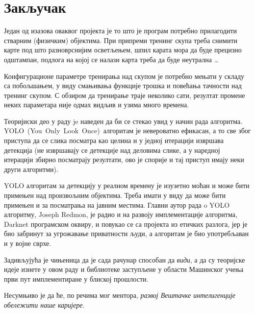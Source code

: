 \documentclass[12pt, а4paper]{article}
\begin{document}
\newpage
\section{Закључак}
Један од изазова оваквог пројекта је
то што је програм потребно прилагодити стварним (физичким)
објектима. При припреми тренинг скупа треба снимити
карте под што разноврснијим осветљењем, шпил карата мора
да буде прецизно одштампан, подлога на којој се налази карта
треба да буде неутрална \dots 

Конфигурационе параметре тренирања над скупом је потребно
мењати у складу са побољшањем, у виду смањивања
функције трошка и повећања тачности над тренинг скупом.
С обзиром да тренирање траје неколико сати, резултат
промене неких параметара није одмах видљив и
узима много времена.

Теоријиски део у раду je наведен да би се стекао увид
у начин рада алгоритма.
\mbox{YOLO (You Only Look Once) алгоритам} је невероватно ефикасан, а то све
због приступа да се слика посматра као целина и у једној итерацији
извршава детекција (не извршавају се детекције над деловима слике, а
у наредној итерацији збирно посматрају резултати, ово је спорије и
тај приступ имају неки други алгоритми).

YOLO алгоритам за детекцију у реалном времену је изузетно моћан
и може бити примењен над произвољним објектима.
Треба имати у виду да може бити примењен и
за посматрања на јавним местима. Главни
аутор рада o YOLO алгоритму, Joseph Redmon, је радио
и на развоју имплементације алгоритма,
Darknet програмском оквиру, и повукао се са пројекта из
етичких разлога, јер је био забринут за угрожавање
приватности људи, а
алгоритам је био употребљаван и у војне сврхе.

Задивљујућа је чињеница да је сада рачунар способан да \textit{види},
а да су теоријске идеје изнете у овом раду 
и библиотеке заступљене у области Машинског учења
први пут имплементиране
у блиској прошлости.

Несумњиво је да ће, по речима мог ментора,
\textit{развој Вештачке интелигенције обележити наше каријере}.

\clearpage
\begingroup
\raggedright
%
\end{document}
